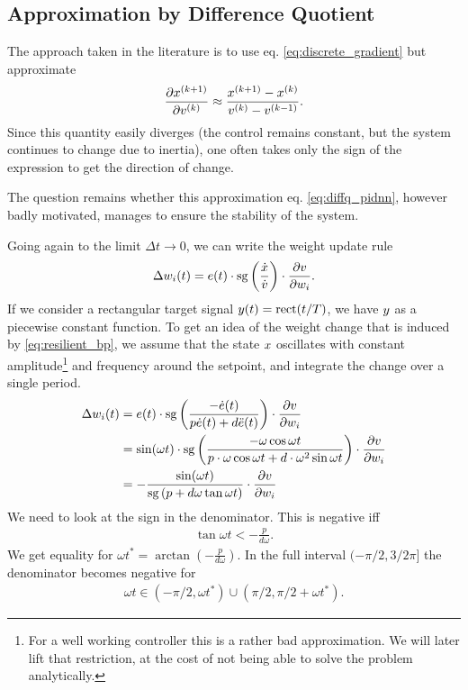 \documentclass{article}
\begin{document}
  \subsection{Approximation by Difference Quotient}
    The approach taken in the literature \cite{cong_novel_2005} is to use eq. \eqref{eq:discrete_gradient} but approximate 
    \begin{align}
        \frac{\partial {x}^{(k+1)}}{\partial {v}^{(k)}} \approx \frac{{x}^{(k+1)} - {x}^{(k)}}{{v}^{(k)} - {v}^{(k-1)}}.
    \end{align}
    Since this quantity easily diverges (the control remains constant, but the system continues to change due to inertia), 
    one often takes only the sign of the expression to get the direction of change. 

    The question remains whether this approximation eq. \eqref{eq:diffq_pidnn}, however badly motivated, manages to ensure
    the stability of the system.

    Going again to the limit $\Delta t \rightarrow 0$, we can write the weight update rule 
    \begin{align}
         \Delta w_i(t) = e(t) \cdot \operatorname{sg} \left(\frac{\dot{x}}{\dot{v}} \right) \cdot \frac{\partial v}{\partial w_i}.
         \label{eq:resilient_bp}
    \end{align}
    If we consider a rectangular target signal $y(t) = \mathrm{rect}(t/T)$, we have $y$ as a piecewise constant function. 
    To get an idea of the weight change that is induced by \eqref{eq:resilient_bp}, we assume that the state $x$ oscillates with constant amplitude\footnote{For a well working controller this is a rather bad approximation. We will later lift that restriction, at the cost of not being able to solve the problem analytically.} and frequency around the setpoint, and integrate the change over a single period.
    \begin{align}
         \Delta w_i(t) &= e(t) \cdot \operatorname{sg} \left( \frac{-\dot{e}(t)}{p \dot{e}(t) + d \ddot{e}(t)} \right)  \cdot \frac{\partial v}{\partial w_i} \label{eq:general_res_bp_wc}\\
         &= \sin(\omega t) \cdot  \mathrm{sg} \left(\frac{-\omega \cos{\omega t}}{p \cdot \omega \cos{\omega t} + d \cdot \omega^2 \sin{\omega t} } \right) \cdot \frac{\partial v}{\partial w_i} \nonumber \\
         &=-\frac{ \sin(\omega t) }{\mathrm{sg}\left(p + d \omega \tan{\omega t}\right) } \cdot \frac{\partial v}{\partial w_i}
    \end{align}
    We need to look at the sign in the denominator. This is negative iff
    \begin{align}
        \tan{\omega t} < -\frac{p}{d \omega}. \label{eq:sign_condition}
    \end{align}
    We get equality for $\omega t^* = \arctan \left(-\frac{p}{d \omega} \right)$. In the full interval $(-\pi/2, 3/2\pi]$ the denominator becomes negative for 
    \begin{align}
        \omega t \in (-\pi/2, \omega t^*) \cup (\pi/2, \pi/2+\omega t^*).
    \end{align}
\end{document}
